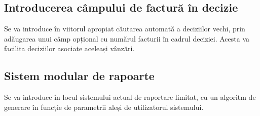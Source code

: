	\subsection{Introducerea câmpului de factură în decizie}

	Se va introduce în viitorul apropiat căutarea automată a deciziilor vechi, prin adăugarea unui câmp opțional cu numărul facturii în cadrul deciziei.
	Acesta va facilita deciziilor asociate aceleași vânzări.

	\subsection{Sistem modular de rapoarte}

	Se va introduce în locul sistemului actual de raportare limitat, cu un algoritm de generare în funcție de parametrii aleși de utilizatorul sistemului.

